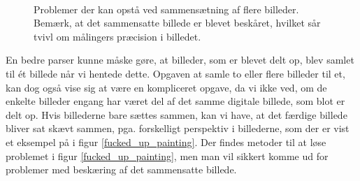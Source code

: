 {\begin{figure}[!h]
    \centering
    \\
    \caption[]{Problemer der kan opstå ved sammensætning af flere
    billeder. Bemærk, at det sammensatte billede er blevet beskåret,
    hvilket sår tvivl om målingers præcision i billedet.}
    \label{fucked_sammensaetning}
\end{figure}

En bedre parser kunne måske gøre, at billeder, som er blevet delt op,
blev samlet til ét billede når vi hentede dette. Opgaven at samle to
eller flere billeder til et, kan dog også vise sig at være en
kompliceret opgave, da vi ikke ved, om de enkelte billeder engang har
været del af det samme digitale billede, som blot er delt op. Hvis
billederne bare sættes sammen, kan vi have, at det færdige billede
bliver sat skævt sammen, pga. forskelligt perspektiv i billederne, som
der er vist et eksempel på i figur \ref{fucked_up_painting}. Der findes
metoder til at løse problemet i figur \ref{fucked_up_painting}, men man
vil sikkert komme ud for problemer med beskæring af det sammensatte
billede.

}
